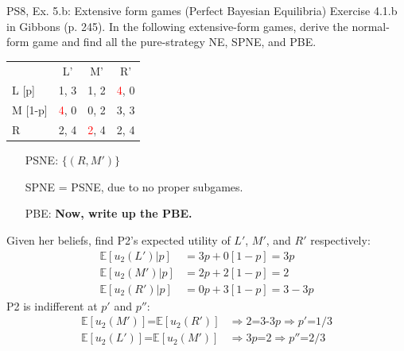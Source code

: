 \begin{frame}{PS8, Ex. 5.b: Extensive form games (Perfect Bayesian Equilibria)}
    Exercise 4.1.b in Gibbons (p. 245). In the following extensive-form games, derive the normal-form game and find all the pure-strategy NE, SPNE, and PBE.
    \vspace{-10pt}
    \begin{multicols}{2}
      \begin{table}
        \begin{tabular}{l|c|c|c|}
          \multicolumn{1}{c}{} & \multicolumn{1}{c}{L'} & \multicolumn{1}{c}{M'} & \multicolumn{1}{c}{R'} \\\cline{2-4}
          L [p]   & 1, \color{blue}3 & 1, 2 & \textcolor{red}{4}, 0 \\\cline{2-4}
          M [1-p] & \textcolor{red}{4}, 0 & 0, 2 & 3, \color{blue}3 \\\cline{2-4}
          R       & 2, \color{blue}4 & \textcolor{red}{2}, \color{blue}4 & 2, \color{blue}4 \\\cline{2-4}
        \end{tabular}
      \end{table} \vspace{-8pt}
      \begin{itemize}
        \item[PSNE:] $\{(R,M')\}$
        \item[SPNE =] PSNE, due to no proper subgames.
        \item[PBE:] \textbf{Now, write up the PBE.}
      \end{itemize} \vspace{-6pt}
      Given her beliefs, find P2's expected utility of $L'$, $M'$, and $R'$ respectively: \vspace{-6pt}
      \begin{align*}
        \mathbb{E}[u_2(L')|p]&=3p+0[1-p]=3p\\
        \mathbb{E}[u_2(M')|p]&=2p+2[1-p]=2\\
        \mathbb{E}[u_2(R')|p]&=0p+3[1-p]=3-3p
      \end{align*}
      P2 is indifferent at $p'$ and $p''$: \vspace{-6pt}
      \begin{align*}
        \mathbb{E}[u_2(M')]\text{=}\mathbb{E}[u_2(R')]&\Rightarrow 2\text{=3-3}p\Rightarrow p'\text{=}1/3\\
        \mathbb{E}[u_2(L')]\text{=}\mathbb{E}[u_2(M')]&\Rightarrow 3p\text{=}2\Rightarrow p''\text{=}2/3
      \end{align*} \vspace{-22pt}

\end{multicols}
\end{frame}
